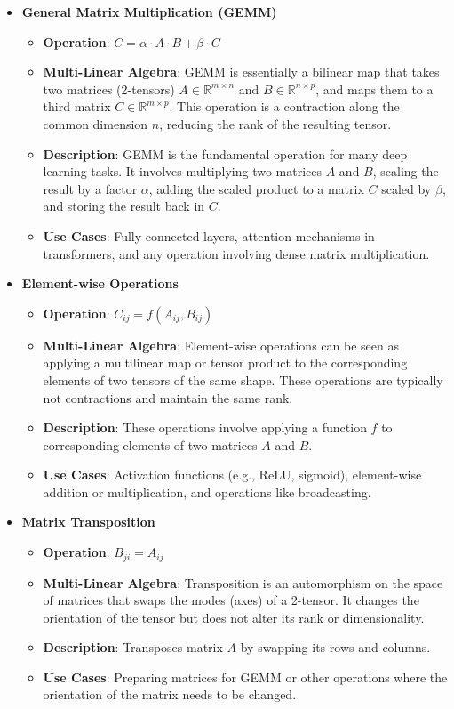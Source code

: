 \documentclass{article}
\begin{document}
\begin{itemize}

\item \textbf{General Matrix Multiplication (GEMM)}
    \begin{itemize}
        \item \textbf{Operation}: \( C = \alpha \cdot A \cdot B + \beta \cdot C \)
        \item \textbf{Multi-Linear Algebra}: GEMM is essentially a bilinear map that takes two matrices (2-tensors) \( A \in \mathbb{R}^{m \times n} \) and \( B \in \mathbb{R}^{n \times p} \), and maps them to a third matrix \( C \in \mathbb{R}^{m \times p} \). This operation is a contraction along the common dimension \( n \), reducing the rank of the resulting tensor.
        \item \textbf{Description}: GEMM is the fundamental operation for many deep learning tasks. It involves multiplying two matrices \(A\) and \(B\), scaling the result by a factor \(\alpha\), adding the scaled product to a matrix \(C\) scaled by \(\beta\), and storing the result back in \(C\).
        \item \textbf{Use Cases}: Fully connected layers, attention mechanisms in transformers, and any operation involving dense matrix multiplication.
    \end{itemize}

\item \textbf{Element-wise Operations}
    \begin{itemize}
        \item \textbf{Operation}: \( C_{ij} = f(A_{ij}, B_{ij}) \)
        \item \textbf{Multi-Linear Algebra}: Element-wise operations can be seen as applying a multilinear map or tensor product to the corresponding elements of two tensors of the same shape. These operations are typically not contractions and maintain the same rank.
        \item \textbf{Description}: These operations involve applying a function \(f\) to corresponding elements of two matrices \(A\) and \(B\).
        \item \textbf{Use Cases}: Activation functions (e.g., ReLU, sigmoid), element-wise addition or multiplication, and operations like broadcasting.
    \end{itemize}

\item \textbf{Matrix Transposition}
    \begin{itemize}
        \item \textbf{Operation}: \( B_{ji} = A_{ij} \)
        \item \textbf{Multi-Linear Algebra}: Transposition is an automorphism on the space of matrices that swaps the modes (axes) of a 2-tensor. It changes the orientation of the tensor but does not alter its rank or dimensionality.
        \item \textbf{Description}: Transposes matrix \(A\) by swapping its rows and columns.
        \item \textbf{Use Cases}: Preparing matrices for GEMM or other operations where the orientation of the matrix needs to be changed.
    \end{itemize}


\end{itemize}
\end{document}
